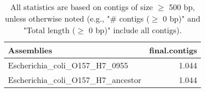 \documentclass[12pt,a4paper]{article}
\begin{document}
\begin{table}[ht]
\begin{center}
\caption{All statistics are based on contigs of size $\geq$ 500 bp, unless otherwise noted (e.g., "\# contigs ($\geq$ 0 bp)" and "Total length ($\geq$ 0 bp)" include all contigs).}
\begin{tabular}{|l*{1}{|r}|}
\hline
Assemblies & final.contigs \\ \hline
Escherichia\_coli\_O157\_H7\_0955 & 1.044 \\ \hline
Escherichia\_coli\_O157\_H7\_ancestor & 1.044 \\ \hline
\end{tabular}
\end{center}
\end{table}
\end{document}
